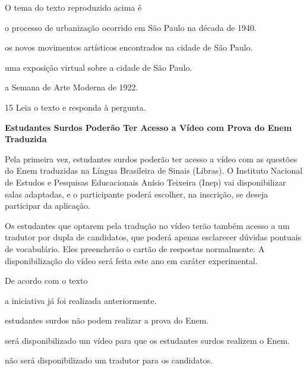 O tema do texto reproduzido acima é

\begin{escolha}
  \item o processo de urbanização ocorrido em São Paulo na década de 1940.

  \item os novos movimentos artísticos encontrados na cidade de São Paulo.

  \item uma exposição virtual sobre a cidade de São Paulo.

  \item a Semana de Arte Moderna de 1922.
\end{escolha}

\num{15} Leia o texto e responda à pergunta.

\begin{myquote}
\textbf{Estudantes Surdos Poderão Ter Acesso a Vídeo com Prova do Enem
Traduzida}

Pela primeira vez, estudantes surdos poderão ter acesso a vídeo com as
questões do Enem traduzidas na Língua Brasileira de Sinais (Libras). O
Instituto Nacional de Estudos e Pesquisas Educacionais Anísio Teixeira
(Inep) vai disponibilizar salas adaptadas, e o participante poderá
escolher, na inscrição, se deseja participar da aplicação.

Os estudantes que optarem pela tradução no vídeo terão também acesso a
um tradutor por dupla de candidatos, que poderá apenas esclarecer
dúvidas pontuais de vocabulário. Eles preencherão o cartão de respostas
normalmente. A disponibilização do vídeo será feita este ano em caráter
experimental.

\end{myquote}

De acordo com o texto

\begin{escolha}
  \item a iniciativa já foi realizada anteriormente.

  \item estudantes surdos não podem realizar a prova do Enem.

  \item será disponibilizado um vídeo para que os estudantes surdos realizem o Enem.

  \item não será disponibilizado um tradutor para os candidatos.
\end{escolha}

